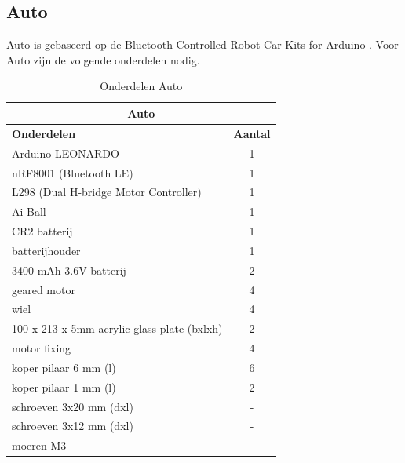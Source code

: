 \documentclass[12pt,a4paper]{article}
\begin{document}
\newpage
\subsection{Auto}
Auto is gebaseerd op de Bluetooth Controlled Robot Car Kits for Arduino \cite{DIY_auto}. Voor Auto zijn de volgende onderdelen nodig. 
\begin{table}[!h]	
	\begin{tabular}{|l|c|}
		\hline \multicolumn{2}{|c|}{\textbf{Auto}}	\\	
		\hline \textbf{Onderdelen} & \textbf{Aantal} \\ 
		\hline Arduino LEONARDO & 1 \\ 
		\hline  nRF8001 (Bluetooth LE) & 1  \\ 
		\hline	L298 (Dual H-bridge Motor Controller) & 1 \\
		\hline Ai-Ball & 1 \\
		\hline  CR2 batterij & 1 \\
		\hline  batterijhouder & 1  \\ 
		\hline 3400 mAh 3.6V batterij & 2 \\ 
		\hline  geared motor & 4 \\
		\hline  wiel	 & 4 \\
		\hline 	100 x 213 x 5mm acrylic glass plate (bxlxh) & 2 \\
		\hline  motor fixing & 4 \\
		\hline	koper pilaar 6 mm (l) & 6 \\
		\hline 	koper pilaar 1 mm (l) & 2 \\
		\hline 	schroeven 3x20 mm (dxl) & - \\
		\hline	schroeven 3x12 mm (dxl) & - \\
		\hline  moeren M3 & - \\	
		\hline
		\end{tabular} 
		\caption{Onderdelen Auto}
		\label{tbl:Onderdelen_auto}
	\end{table}
	
\end{document}
